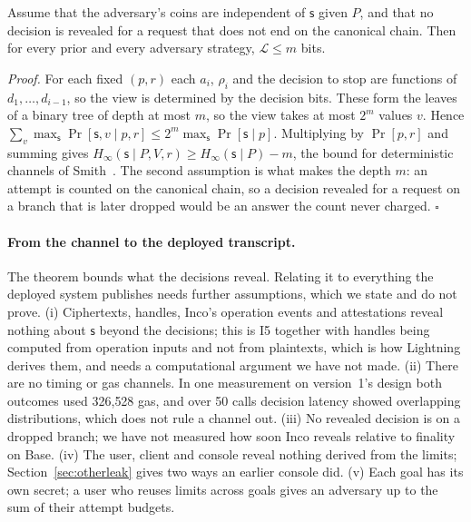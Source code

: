 \begin{theorem}\label{prop:leakproof}
Assume that the adversary's coins are independent of $\mathsf{s}$ given $P$, and that no decision is revealed for a request that does not end on
the canonical chain. Then for every prior and every adversary strategy, $\mathcal{L} \le m$ bits.
\end{theorem}

\noindent\emph{Proof.} For each fixed $(p, r)$ each $a_i$, $\rho_i$ and the decision to stop are functions of $d_1, \ldots, d_{i-1}$, so the view is
determined by the decision bits. These form the leaves of a binary tree of depth at most $m$, so the view takes at most $2^m$ values $v$. Hence
$\sum_v \max_{\mathsf{s}} \Pr[\mathsf{s}, v \mid p, r] \le 2^m \max_{\mathsf{s}} \Pr[\mathsf{s} \mid p]$. Multiplying by $\Pr[p, r]$ and summing gives
$H_\infty(\mathsf{s} \mid P, V, r) \ge H_\infty(\mathsf{s} \mid P) - m$, the bound for deterministic channels of Smith~\cite{smith2009}. The second
assumption is what makes the depth $m$: an attempt is counted on the canonical chain, so a decision revealed for a request on a branch that is later
dropped would be an answer the count never charged. \hfill$\square$

\paragraph{From the channel to the deployed transcript.} The theorem bounds what the decisions reveal. Relating it to everything the deployed
system publishes needs further assumptions, which we state and do not prove. (i) Ciphertexts, handles, Inco's operation events and attestations
reveal nothing about $\mathsf{s}$ beyond the decisions; this is I5 together with handles being computed from operation inputs and not from
plaintexts, which is how Lightning derives them, and needs a computational argument we have not made. (ii) There are no timing or gas channels.
In one measurement on version~1's design both outcomes used 326{,}528 gas, and over 50 calls decision latency showed overlapping distributions,
which does not rule a channel out. (iii) No revealed decision is on a dropped branch; we have not measured how soon Inco reveals relative to
finality on Base. (iv) The user, client and console reveal nothing derived from the limits; Section~\ref{sec:otherleak} gives two ways an earlier
console did. (v) Each goal has its own secret; a user who reuses limits across goals gives an adversary up to the sum of their attempt budgets.

